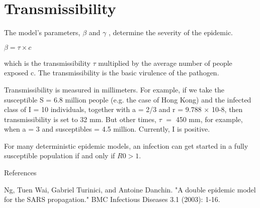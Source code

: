 \documentclass{bmcart}
\begin{document}
\section{Transmissibility}

The model's parameters,
$\beta$ and $\gamma$ , determine the severity of the epidemic.

\begin{math}
\beta = \tau \times c
\end{math}


which is the transmissibility $\tau$ multiplied by the average number of people exposed c. The transmissibility is the basic virulence of the pathogen. 

Transmissibility is measured in millimeters.  
For example, if we take the susceptible S = 6.8
million people (e.g. the case of Hong Kong) and the
infected class of I = 10 individuals, together with a = 2/3
and r = 9.788 × 10-8, then transmissibility is set to 32 mm. But other times, $\tau$ $=$ 450 mm, for example, when a = 3 and susceptibles = 4.5 million. Currently, I is positive. 

For many deterministic epidemic models, an infection can get started in a fully
susceptible population if and only if $R0 > 1$. 





\begin{backmatter}

References

Ng, Tuen Wai, Gabriel Turinici, and Antoine Danchin. "A double epidemic model for the SARS propagation." BMC Infectious Diseases 3.1 (2003): 1-16.


\end{backmatter}
\end{document}
